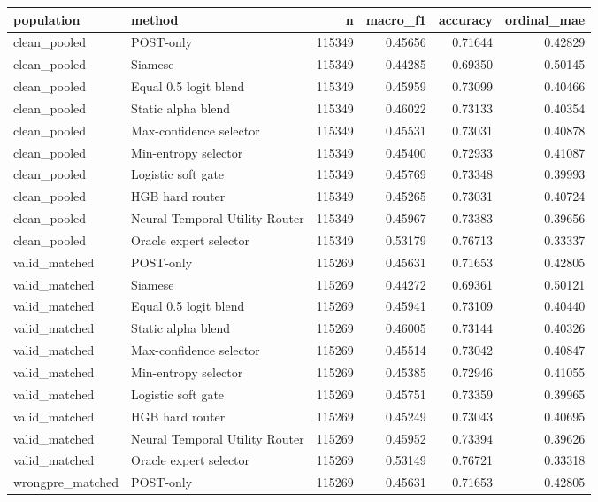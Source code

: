 \begin{tabular}{llrrrr}
\toprule
population & method & n & macro\_f1 & accuracy & ordinal\_mae \\
\midrule
clean\_pooled & POST-only & 115349 & 0.45656 & 0.71644 & 0.42829 \\
clean\_pooled & Siamese & 115349 & 0.44285 & 0.69350 & 0.50145 \\
clean\_pooled & Equal 0.5 logit blend & 115349 & 0.45959 & 0.73099 & 0.40466 \\
clean\_pooled & Static alpha blend & 115349 & 0.46022 & 0.73133 & 0.40354 \\
clean\_pooled & Max-confidence selector & 115349 & 0.45531 & 0.73031 & 0.40878 \\
clean\_pooled & Min-entropy selector & 115349 & 0.45400 & 0.72933 & 0.41087 \\
clean\_pooled & Logistic soft gate & 115349 & 0.45769 & 0.73348 & 0.39993 \\
clean\_pooled & HGB hard router & 115349 & 0.45265 & 0.73031 & 0.40724 \\
clean\_pooled & Neural Temporal Utility Router & 115349 & 0.45967 & 0.73383 & 0.39656 \\
clean\_pooled & Oracle expert selector & 115349 & 0.53179 & 0.76713 & 0.33337 \\
valid\_matched & POST-only & 115269 & 0.45631 & 0.71653 & 0.42805 \\
valid\_matched & Siamese & 115269 & 0.44272 & 0.69361 & 0.50121 \\
valid\_matched & Equal 0.5 logit blend & 115269 & 0.45941 & 0.73109 & 0.40440 \\
valid\_matched & Static alpha blend & 115269 & 0.46005 & 0.73144 & 0.40326 \\
valid\_matched & Max-confidence selector & 115269 & 0.45514 & 0.73042 & 0.40847 \\
valid\_matched & Min-entropy selector & 115269 & 0.45385 & 0.72946 & 0.41055 \\
valid\_matched & Logistic soft gate & 115269 & 0.45751 & 0.73359 & 0.39965 \\
valid\_matched & HGB hard router & 115269 & 0.45249 & 0.73043 & 0.40695 \\
valid\_matched & Neural Temporal Utility Router & 115269 & 0.45952 & 0.73394 & 0.39626 \\
valid\_matched & Oracle expert selector & 115269 & 0.53149 & 0.76721 & 0.33318 \\
wrongpre\_matched & POST-only & 115269 & 0.45631 & 0.71653 & 0.42805 \\

\end{tabular}
